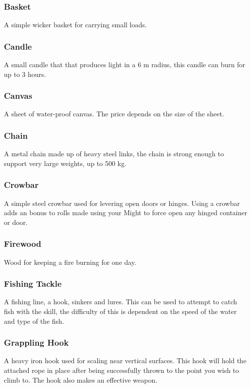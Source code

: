 \documentclass[a4paper,11pt,oneside]{book}
\newcommand{\textlf}[1]{\textbf{\titlecap{#1}}}
\begin{document}
\subsubsection*{Basket}
A simple wicker basket for carrying small loads.

\subsubsection*{Candle}
A small candle that that produces \textlf{low} light in a 6 m radius, this candle can burn for up to 3 hours.

\subsubsection*{Canvas}
A sheet of water-proof canvas. The price depends on the size of the sheet.

\subsubsection*{Chain}
A metal chain made up of heavy steel links, the chain is strong enough to support very large weights, up to 500 kg.

\subsubsection*{Crowbar}
A simple steel crowbar used for levering open doors or hinges. Using a crowbar adds an \textlf{edge} bonus to rolls made using your Might to force open any hinged container or door.

\subsubsection*{Firewood}
Wood for keeping a fire burning for one day.

\subsubsection*{Fishing Tackle}
A fishing line, a hook, sinkers and lures. This can be used to attempt to catch fish with the \textlf{Survival} skill, the difficulty of this is dependent on the speed of the water and type of the fish.

\subsubsection*{Grappling Hook}
A heavy iron hook used for scaling near vertical surfaces. This hook will hold the attached rope in place after being successfully thrown to the point you wish to climb to. The hook also makes an effective weapon.
\end{document}
